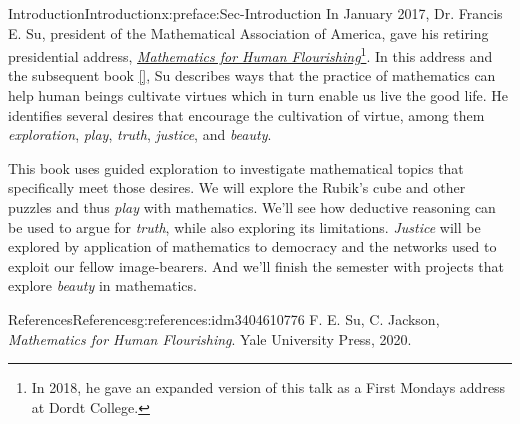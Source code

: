 \documentclass[oneside,10pt,]{book}
\newcommand{\xreffont}{\relax}
\numberwithin{equation}{section}
\begin{document}
\null\clearpage
%
%
\typeout{************************************************}
\typeout{************************************************}
%
\begin{preface}{Introduction}{}{Introduction}{}{}{x:preface:Sec-Introduction}
In January 2017, Dr. Francis E. Su, president of the Mathematical Association of America, gave his retiring presidential address, \emph{\href{https://mathyawp.wordpress.com/2017/01/08/mathematics-for-human-flourishing/}{Mathematics for Human Flourishing}}\footnote{In 2018, he gave an expanded version of this talk as a First Mondays address at Dordt College.\label{g:fn:idm3404616792}}. In this address and the subsequent book \hyperlink{x:biblio:Su2020}{[{\xreffont 1}]}, Su describes ways that the practice of mathematics can help human beings cultivate virtues which in turn enable us live the good life. He identifies several desires that encourage the cultivation of virtue, among them \emph{exploration}, \emph{play}, \emph{truth}, \emph{justice}, and \emph{beauty}.%
\par
This book uses guided exploration to investigate mathematical topics that specifically meet those desires. We will explore the Rubik's cube and other puzzles and thus \emph{play} with mathematics. We'll see how deductive reasoning can be used to argue for \emph{truth}, while also exploring its limitations. \emph{Justice} will be explored by application of mathematics to democracy and the networks used to exploit our fellow image-bearers. And we'll finish the semester with projects that explore \emph{beauty} in mathematics.%
%
%
\typeout{************************************************}
\typeout{************************************************}
%
\begin{references--numberless}{References}{}{References}{}{}{g:references:idm3404610776}
F. E. Su, C. Jackson, \emph{Mathematics for Human Flourishing}. Yale University Press, 2020.\end{references--numberless}
\end{preface}
%
%
\typeout{************************************************}
\typeout{************************************************}
%
\end{document}
